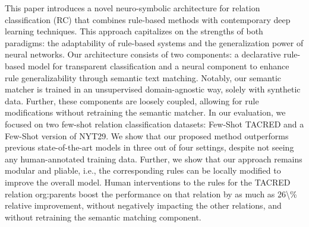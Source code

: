 This paper introduces a novel neuro-symbolic architecture for relation classification (RC) that combines rule-based methods with contemporary deep learning techniques.  This approach capitalizes on the strengths of both paradigms: the adaptability of rule-based systems and the generalization power of neural networks. Our architecture consists of two components: a declarative rule-based model for transparent classification and a neural component to enhance rule generalizability through semantic text matching. Notably, our semantic matcher is trained in an unsupervised domain-agnostic way, solely with synthetic data. Further, these components are loosely coupled, allowing for rule modifications without retraining the semantic matcher. In our evaluation, we focused on two few-shot relation classification datasets: Few-Shot TACRED and a Few-Shot version of NYT29.  We show that our proposed method outperforms previous state-of-the-art models in three out of four settings, despite not seeing any human-annotated training data. Further, we show that our approach remains modular and pliable, i.e., the corresponding rules can be locally modified to improve the overall model. Human interventions to the rules for the TACRED relation org:parents boost the performance on that relation by as much as 26\textbackslash{}\% relative improvement, without negatively impacting the other relations, and without retraining the semantic matching component.